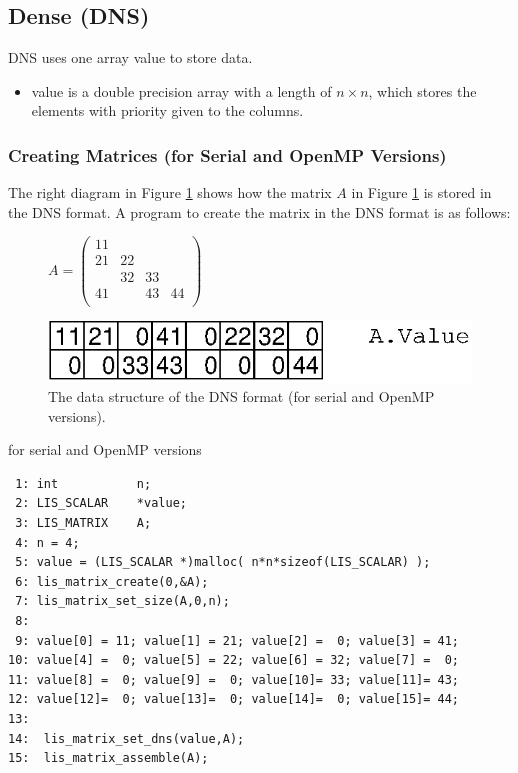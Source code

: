 \documentclass[a4paper]{article}
\begin{document}
\newpage
\subsection{Dense (DNS)}
DNS uses one array {\ttfamily value} to store data.
\begin{itemize}
\item {\ttfamily value} is a double precision array with a length of $n
      \times n$, which stores the elements with priority given to the columns.
\end{itemize}

\subsubsection{Creating Matrices (for Serial and OpenMP Versions)}
The right diagram in Figure \ref{fig:storage11} shows how the matrix $A$ in Figure \ref{fig:storage11} is stored in the DNS format. A program to create the matrix in the DNS format is as follows:
\begin{figure}[h]
{\centering 
\begin{minipage}{0.3\textwidth}
\begin{flushright}
$ 
A = \left(
\begin{array}{cccc}
11 &    &    &    \\
21 & 22 &    &    \\
   & 32 & 33 &    \\
41 &    & 43 & 44 \\
\end{array}\right)
$
\end{flushright}
\end{minipage}
\begin{minipage}{0.6\textwidth}
\begin{flushleft}
\includegraphics{storage11.eps} 
\end{flushleft}
\end{minipage}
\caption{The data structure of the DNS format (for serial and OpenMP versions).}\label{fig:storage11}}
\end{figure}
\begin{itembox}[l]{for serial and OpenMP versions}
\small
\begin{verbatim}
 1: int           n;
 2: LIS_SCALAR    *value;
 3: LIS_MATRIX    A;
 4: n = 4;
 5: value = (LIS_SCALAR *)malloc( n*n*sizeof(LIS_SCALAR) );
 6: lis_matrix_create(0,&A);
 7: lis_matrix_set_size(A,0,n);
 8:
 9: value[0] = 11; value[1] = 21; value[2] =  0; value[3] = 41;
10: value[4] =  0; value[5] = 22; value[6] = 32; value[7] =  0;
11: value[8] =  0; value[9] =  0; value[10]= 33; value[11]= 43;
12: value[12]=  0; value[13]=  0; value[14]=  0; value[15]= 44;
13:
14:  lis_matrix_set_dns(value,A);
15:  lis_matrix_assemble(A);
\end{verbatim}
\end{itembox}
\newpage
\end{document}

